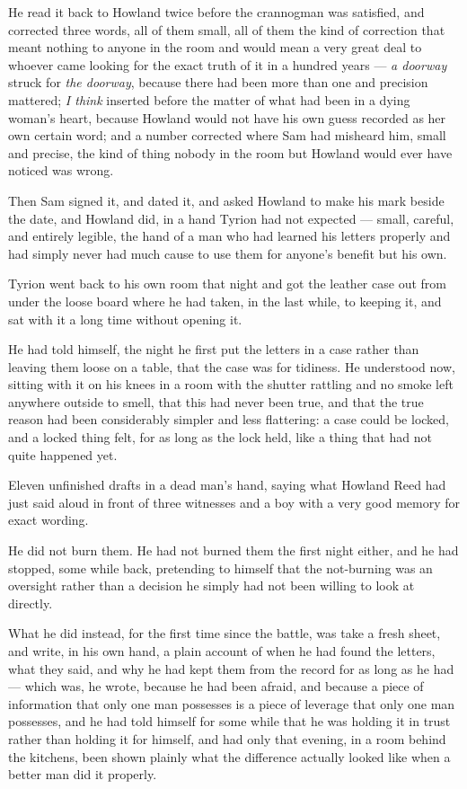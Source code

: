 \sceneBreak

He read it back to Howland twice before the crannogman was satisfied, and corrected three words, all of them small, all of them the kind of correction that meant nothing to anyone in the room and would mean a very great deal to whoever came looking for the exact truth of it in a hundred years — \textit{a doorway} struck for \textit{the doorway}, because there had been more than one and precision mattered; \textit{I think} inserted before the matter of what had been in a dying woman’s heart, because Howland would not have his own guess recorded as her own certain word; and a number corrected where Sam had misheard him, small and precise, the kind of thing nobody in the room but Howland would ever have noticed was wrong.

Then Sam signed it, and dated it, and asked Howland to make his mark beside the date, and Howland did, in a hand Tyrion had not expected — small, careful, and entirely legible, the hand of a man who had learned his letters properly and had simply never had much cause to use them for anyone’s benefit but his own.

\sceneBreak

Tyrion went back to his own room that night and got the leather case out from under the loose board where he had taken, in the last while, to keeping it, and sat with it a long time without opening it.

He had told himself, the night he first put the letters in a case rather than leaving them loose on a table, that the case was for tidiness. He understood now, sitting with it on his knees in a room with the shutter rattling and no smoke left anywhere outside to smell, that this had never been true, and that the true reason had been considerably simpler and less flattering: a case could be locked, and a locked thing felt, for as long as the lock held, like a thing that had not quite happened yet.

Eleven unfinished drafts in a dead man’s hand, saying what Howland Reed had just said aloud in front of three witnesses and a boy with a very good memory for exact wording.

He did not burn them. He had not burned them the first night either, and he had stopped, some while back, pretending to himself that the not-burning was an oversight rather than a decision he simply had not been willing to look at directly.

What he did instead, for the first time since the battle, was take a fresh sheet, and write, in his own hand, a plain account of when he had found the letters, what they said, and why he had kept them from the record for as long as he had — which was, he wrote, because he had been afraid, and because a piece of information that only one man possesses is a piece of leverage that only one man possesses, and he had told himself for some while that he was holding it in trust rather than holding it for himself, and had only that evening, in a room behind the kitchens, been shown plainly what the difference actually looked like when a better man did it properly.

